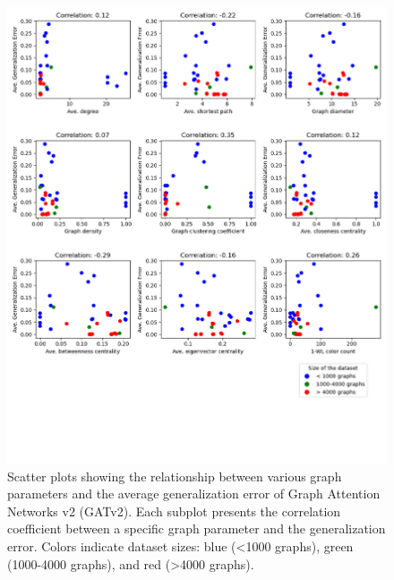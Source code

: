 \begin{figure}[H]
    \centering
    \includegraphics[width=\textwidth]{images/correlation_GATv2.png}
    \caption{Scatter plots showing the relationship between various graph parameters and the average generalization error of Graph Attention Networks v2 (GATv2). Each subplot presents the correlation coefficient between a specific graph parameter and the generalization error. Colors indicate dataset sizes: blue (<1000 graphs), green (1000-4000 graphs), and red (>4000 graphs).}
    \label{fig:correlation_GATv2}
\end{figure}

